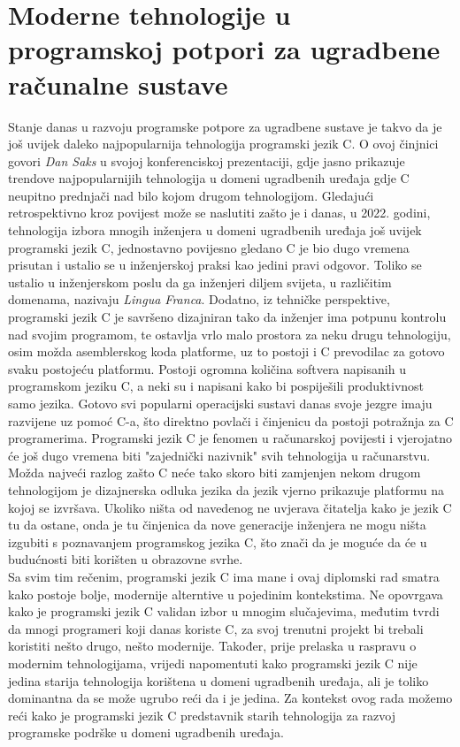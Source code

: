 \chapter{Moderne tehnologije u programskoj potpori za ugradbene računalne sustave}
Stanje danas u razvoju programske potpore za ugradbene sustave je takvo da je još uvijek daleko najpopularnija tehnologija programski jezik C. O ovoj činjnici govori \textit{Dan Saks} u svojoj konferenciskoj prezentaciji\cite{danSaksWritingBetterEmbeddedSoftware}, gdje jasno prikazuje trendove najpopularnijih tehnologija u domeni ugradbenih uređaja gdje C neupitno prednjači nad bilo kojom drugom tehnologijom. Gledajući retrospektivno kroz povijest može se naslutiti zašto je i danas, u 2022. godini, tehnologija izbora mnogih inženjera u domeni ugradbenih uređaja još uvijek programski jezik C, jednostavno povijesno gledano C je bio dugo vremena prisutan i ustalio se u inženjerskoj praksi kao jedini pravi odgovor. Toliko se ustalio u inženjerskom poslu da ga inženjeri diljem svijeta, u različitim domenama, nazivaju \textit{Lingua Franca}. Dodatno, iz tehničke perspektive, programski jezik C je savršeno dizajniran tako da inženjer ima potpunu kontrolu nad svojim programom, te ostavlja vrlo malo prostora za neku drugu tehnologiju, osim možda asemblerskog koda platforme, uz to postoji i C prevodilac za gotovo svaku postojeću platformu. Postoji ogromna količina softvera napisanih u programskom jeziku C, a neki su i napisani kako bi pospiješili produktivnost samo jezika. Gotovo svi popularni operacijski sustavi danas svoje jezgre imaju razvijene uz pomoć C-a, što direktno povlači i činjenicu da postoji potražnja za C programerima. Programski jezik C je fenomen u računarskoj povijesti i vjerojatno će još dugo vremena biti "zajednički nazivnik" svih tehnologija u računarstvu. Možda najveći razlog zašto C neće tako skoro biti zamjenjen nekom drugom tehnologijom je dizajnerska odluka jezika da jezik vjerno prikazuje platformu na kojoj se izvršava. Ukoliko ništa od navedenog ne uvjerava čitatelja kako je jezik C tu da ostane, onda je tu činjenica da nove generacije inženjera ne mogu ništa izgubiti s poznavanjem programskog jezika C, što znači da je moguće da će u budućnosti biti korišten u obrazovne svrhe. \\
Sa svim tim rečenim, programski jezik C ima mane i ovaj diplomski rad smatra kako postoje bolje, modernije alterntive u pojedinim kontekstima. Ne opovrgava kako je programski jezik C validan izbor u mnogim slučajevima, međutim tvrdi da mnogi programeri koji danas koriste C, za svoj trenutni projekt bi trebali koristiti nešto drugo, nešto modernije. Također, prije prelaska u raspravu o modernim tehnologijama, vrijedi napomentuti kako programski jezik C nije jedina starija tehnologija korištena u domeni ugradbenih uređaja, ali je toliko dominantna da se može ugrubo reći da i je jedina. Za kontekst ovog rada možemo reći kako je programski jezik C predstavnik starih tehnologija za razvoj programske podrške u domeni ugradbenih uređaja. \\
